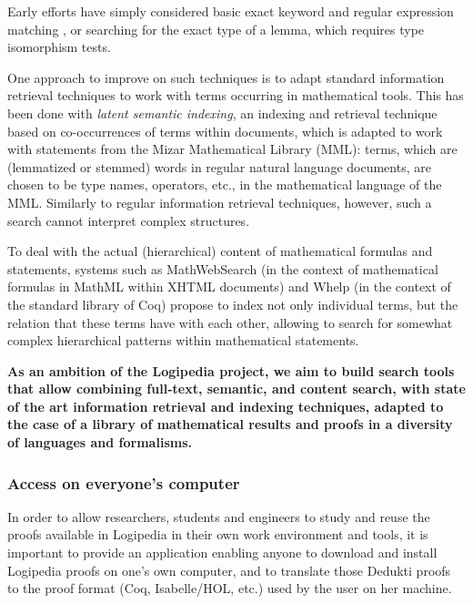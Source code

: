 Early efforts have simply considered
basic exact keyword and regular expression matching 
\cite{DBLP:conf/mkm/BancerekR03}, or searching for the exact type of a lemma,
which requires type isomorphism tests\cite{DBLP:conf/types/Delahaye99}.

One approach to improve on such techniques is to
adapt standard information retrieval techniques to work with terms
occurring in mathematical tools. This has been done\cite{DBLP:conf/mkm/Cairns04}
with \emph{latent semantic indexing}, an
indexing and retrieval technique based on co-occurrences of terms within
documents, which is adapted to work with statements from the Mizar
Mathematical Library (MML): terms, which are (lemmatized or stemmed)
words in regular natural language documents, are chosen to be type names,
operators, etc., in the mathematical language of the MML. Similarly to
regular information retrieval techniques, however, such a search cannot
interpret complex structures.

To deal with the actual (hierarchical) content of mathematical formulas
and statements, systems such as
MathWebSearch\cite{DBLP:conf/aisc/KohlhaseMP12} (in the context of
mathematical formulas in MathML within XHTML documents) and
Whelp\cite{DBLP:conf/types/AspertiGCTZ04} (in the context of the standard
library of Coq) propose to index not only individual terms, but the
relation that these terms have with each other, allowing to search for
somewhat complex hierarchical patterns within mathematical statements.

{\bf As an ambition of the Logipedia project, we aim to build search
  tools that allow combining full-text, semantic, and content search,
  with state of the art information retrieval and indexing techniques,
  adapted to the case of a library of mathematical results and proofs
  in a diversity of languages and formalisms.}

\subsubsection*{Access on everyone's computer}

In order to allow researchers, students and engineers to study and
reuse the proofs available in Logipedia in their own work environment
and tools, it is important to provide an application enabling anyone
to download and install Logipedia proofs on one's own computer, and to
translate those Dedukti proofs to the proof format (Coq, Isabelle/HOL,
etc.) used by the user on her machine.

